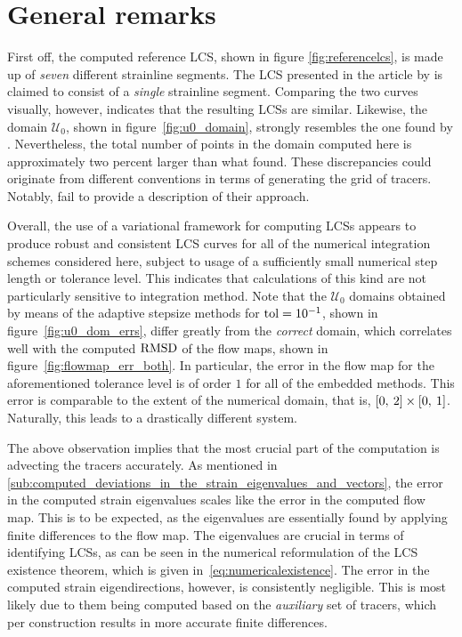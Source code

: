 \section{General remarks}
\label{sec:general_remarks}

First off, the computed reference LCS, shown in figure
\ref{fig:referencelcs}, is made up of \emph{seven} different strainline segments.
The LCS presented in the article by \textcite{farazmand2012computing} is claimed
to consist of a \emph{single} strainline segment. Comparing the two curves
visually, however, indicates that the resulting LCSs are similar. Likewise, the
domain $\mathcal{U}_{0}$, shown in figure~\ref{fig:u0_domain}, strongly
resembles the one found by \citeauthor{farazmand2012computing}. Nevertheless,
the total number of points in the domain computed here is approximately two
percent larger than what \citeauthor{farazmand2012computing} found. These
discrepancies could originate from different conventions in terms of generating
the grid of tracers. Notably, \citeauthor{farazmand2012computing} fail to
provide a description of their approach.

Overall, the use of a variational framework for computing LCSs appears to
produce robust and consistent LCS curves for all of the numerical integration
schemes considered here, subject to usage of a sufficiently small numerical
step length or tolerance level. This indicates that calculations of this kind
are not particularly sensitive to integration method. Note that the
$\mathcal{U}_{0}$ domains obtained by means of the adaptive stepsize methods
for $\textnormal{tol}=10^{-1}$, shown in figure~\ref{fig:u0_dom_errs}, differ
greatly from the \emph{correct} domain, which correlates well with the computed
$\operatorname{RMSD}$ of the flow maps, shown in figure~\ref{fig:flowmap_err_both}. In
particular, the error in the flow map for the aforementioned tolerance level is
of order $1$ for all of the embedded methods. This error is comparable to the
extent of the numerical domain, that is,
$[0,\hspace{0.5ex}2]\times[0,\hspace{0.5ex}1]$. Naturally, this leads to a
drastically different system.

The above observation implies that the most crucial part of the computation is
advecting the tracers accurately. As mentioned in
\cref{sub:computed_deviations_in_the_strain_eigenvalues_and_vectors}, the error
in the computed strain eigenvalues scales like the error in the computed flow
map. This is to be expected, as the eigenvalues are essentially found by
applying finite differences to the flow map. The eigenvalues are crucial in
terms of identifying LCSs, as can be seen in the numerical reformulation of the
LCS existence theorem, which is given in~\cref{eq:numericalexistence}.
The error in the computed strain eigendirections, however, is consistently
negligible. This is most likely due to them being computed based on the %
\emph{auxiliary} set of tracers, which per construction results in more accurate
finite differences.

